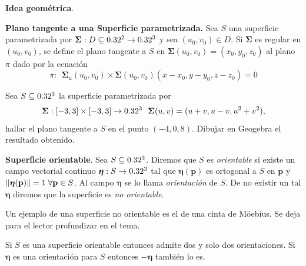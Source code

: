 \begin{obs}\textbf{Idea geom\'etrica}.
\end{obs}

\begin{definition} \textbf{Plano tangente a una  Superficie parametrizada.}  Sea $S$ una superficie parametrizada por $\boldsymbol{\Sigma}:D \subseteq0.32^2 \to0.32^3$ y sea $(u_0,v_0) \in D$. Si $\boldsymbol{\Sigma}$ es regular en $(u_0,v_0)$, se define el plano tangente a $S$ en $\boldsymbol{\Sigma}(u_0,v_0)=(x_0,y_0,z_0)$ al plano $\pi$ dado por la ecuaci\'on
$$\pi: \:\:   \boldsymbol{\Sigma}_u(u_0,v_0)\times\boldsymbol{\Sigma}(u_0,v_0)(x-x_0, y-y_0, z-z_0 )=0$$
\end{definition}

\begin{tarea} Sea $S  \subseteq0.32^3$ la superficie parametrizada por  $$\boldsymbol{\Sigma}: [-3,3]\times[-3,3] \to0.32^3 \:\:\:  \boldsymbol{\Sigma}(u,v)=(u+v,u-v, u^{2}+v^{2}), $$ hallar el plano tangente a $S$ en el punto $(-4,0,8).$  Dibujar en Geogebra el resultado obtenido.   
\end{tarea}


\begin{definition} \textbf{Superficie orientable}.    Sea $S\subseteq0.32^3$. Diremos que  $S$  es  \emph{orientable} si existe un campo vectorial  continuo  $\boldsymbol{\eta}:S\to0.32^3$ tal que $\boldsymbol{\eta}(\mathbf{p})$ es ortogonal a $S$ en $\mathbf{p}$ y $\norm{\boldsymbol{\eta}(\mathbf{p})}=1\;\forall \mathbf{p}\in S$. Al campo $\boldsymbol{\eta}$ se lo llama \emph{orientaci\'on} de $S$. De no existir un  tal $\boldsymbol{\eta}$ diremos que la superficie es \emph{no orientable}.
\end{definition}


\begin{example} Un ejemplo de una  superficie no orientable es el de una cinta de Möebius. Se deja para el lector profundizar en el tema. 

\vspace{0.3 cm}


\end{example}

\begin{obs}
    Si $S$ es una superficie orientable entonces admite dos y solo dos orientaciones. Si  $\boldsymbol{\eta}$  es una orientaci\'on para $S$ entonces  $-\boldsymbol{\eta}$ tambi\'en lo es.
\end{obs}

